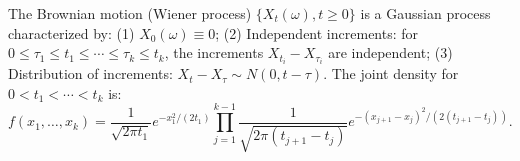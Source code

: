 The Brownian motion (Wiener process) $\{X_t(\omega), t \geq 0\}$ is a Gaussian process characterized by:
(1) $X_0(\omega) \equiv 0$;
(2) Independent increments: for $0 \leq \tau_1 \leq t_1 \leq \cdots \leq \tau_k \leq t_k$, the increments $X_{t_i} - X_{\tau_i}$ are independent;
(3) Distribution of increments: $X_t - X_\tau \sim N(0, t - \tau)$.
The joint density for $0 < t_1 < \cdots < t_k$ is:
$$f(x_1, \ldots, x_k) = \frac{1}{\sqrt{2\pi t_1}} e^{-x_1^2/(2t_1)} \prod_{j=1}^{k-1} \frac{1}{\sqrt{2\pi(t_{j+1} - t_j)}} e^{-(x_{j+1} - x_j)^2/(2(t_{j+1} - t_j))}.$$
